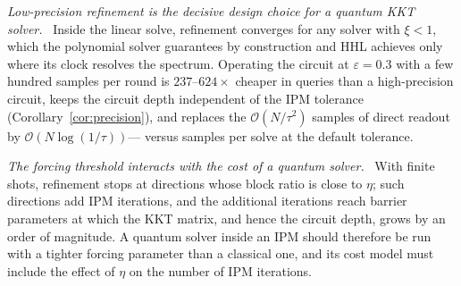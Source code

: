 \documentclass[11pt]{article}
\theoremstyle{definition}
\newcommand{\eps}{\varepsilon}
\newcommand{\bigO}{\mathcal{O}}
\newcommand{\lead}[1]{\emph{#1}\ }
\begin{document}
\lead{Low-precision refinement is the decisive design choice for a quantum KKT solver.} Inside the linear solve, refinement converges for any solver with $\xi<1$, which the polynomial solver guarantees by construction and HHL achieves only where its clock resolves the spectrum. Operating the circuit at $\eps=0.3$ with a few hundred samples per round is $237$--$624\times$ cheaper in queries than a high-precision circuit, keeps the circuit depth independent of the IPM tolerance (Corollary~\ref{cor:precision}), and replaces the $\bigO(N/\tau^2)$ samples of direct readout by $\bigO(N\log(1/\tau))$---\directSamples{} versus  samples per solve at the default tolerance.

\lead{The forcing threshold interacts with the cost of a quantum solver.} With finite shots, refinement stops at directions whose block ratio is close to $\eta$; such directions add IPM iterations, and the additional iterations reach barrier parameters at which the KKT matrix, and hence the circuit depth, grows by an order of magnitude. A quantum solver inside an IPM should therefore be run with a tighter forcing parameter than a classical one, and its cost model must include the effect of $\eta$ on the number of IPM iterations.
\end{document}
